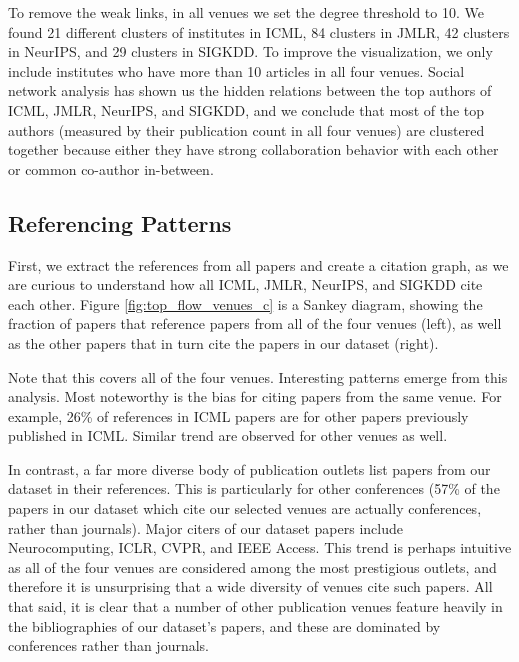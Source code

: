 To remove the weak links, in all venues we set the degree threshold to 10. We found 21 different clusters of institutes in ICML, 84 clusters in JMLR, 42 clusters in NeurIPS, and 29 clusters in SIGKDD. To improve the visualization, we only include institutes who have more than 10 articles in all four venues. Social network analysis has shown us the hidden relations between the top authors of ICML, JMLR, NeurIPS, and SIGKDD, and we conclude that most of the top authors (measured by their publication count in all four venues) are clustered together because either they have strong collaboration behavior with each other or common co-author in-between.

\subsection{Referencing Patterns}
First, we extract the references from all papers and create a citation graph, as we are curious to understand how all ICML, JMLR, NeurIPS, and SIGKDD cite each other.
Figure \ref{fig:top_flow_venues_c} is a Sankey diagram, showing the fraction of papers that reference papers from all of the four venues (left), as well as the other papers that in turn cite the papers in our dataset (right). 

Note that this covers all of the four venues. 
Interesting patterns emerge from this analysis. 
Most noteworthy is the bias for citing papers from the same venue. For example, 26\% of references in ICML papers are for other papers previously published in ICML. Similar trend are observed for other venues as well. 


In contrast, a far more diverse body of publication outlets list papers from our dataset in their references. This is particularly for other conferences (57\% of the papers in our dataset which cite our selected venues are actually conferences, rather than journals). 
Major citers of our dataset papers include Neurocomputing, ICLR, CVPR, and IEEE Access.
This trend is perhaps intuitive as all of the four venues are considered among the most prestigious outlets, and therefore it is unsurprising that a wide diversity of venues cite such papers. 
All that said, it is clear that a number of other publication venues feature heavily in the bibliographies of our dataset's papers, and these are dominated by conferences rather than journals.



